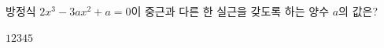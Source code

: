 방정식 $2x^3-3ax^2+a=0$이 중근과 다른 한 실근을 갖도록 하는 양수 $a$의 값은?
\begin{choices32}{$1$}{$2$}{$3$}{$4$}{$5$}\end{choices32}
